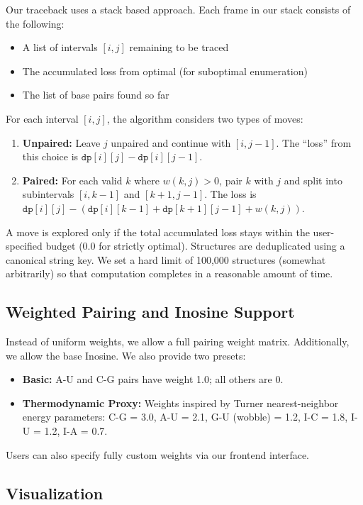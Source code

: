 \documentclass[12pt]{article}
\begin{document}
Our traceback uses a stack based approach. Each frame in our stack consists of the following: 
\begin{itemize}
    \item A list of intervals $[i, j]$ remaining to be traced
    \item The accumulated loss from optimal (for suboptimal enumeration)
    \item The list of base pairs found so far
\end{itemize}
For each interval $[i, j]$, the algorithm considers two types of moves:
\begin{enumerate}
    \item \textbf{Unpaired:} Leave $j$ unpaired and continue with $[i, j-1]$. The ``loss'' from this choice is $\texttt{dp}[i][j] - \texttt{dp}[i][j-1]$.
    \item \textbf{Paired:} For each valid $k$ where $w(k, j) > 0$, pair $k$ with $j$ and split into subintervals $[i, k-1]$ and $[k+1, j-1]$. The loss is $\texttt{dp}[i][j] - (\texttt{dp}[i][k-1] + \texttt{dp}[k+1][j-1] + w(k,j))$.
\end{enumerate}
A move is explored only if the total accumulated loss stays within the user-specified budget (0.0 for strictly optimal). Structures are deduplicated using a canonical string key. We set a hard limit of 100{,}000 structures (somewhat arbitrarily) so that computation completes in a reasonable amount of time. 
\subsection{Weighted Pairing and Inosine Support}
Instead of uniform weights, we allow a full pairing weight matrix. Additionally, we allow the base Inosine. We also provide two presets:
\begin{itemize}
    \item \textbf{Basic:} A-U and C-G pairs have weight 1.0; all others are 0.
    \item \textbf{Thermodynamic Proxy:} Weights inspired by Turner nearest-neighbor energy parameters: C-G = 3.0, A-U = 2.1, G-U (wobble) = 1.2, I-C = 1.8, I-U = 1.2, I-A = 0.7.
\end{itemize}
Users can also specify fully custom weights via our frontend interface. 

\subsection{Visualization}
\end{document}
